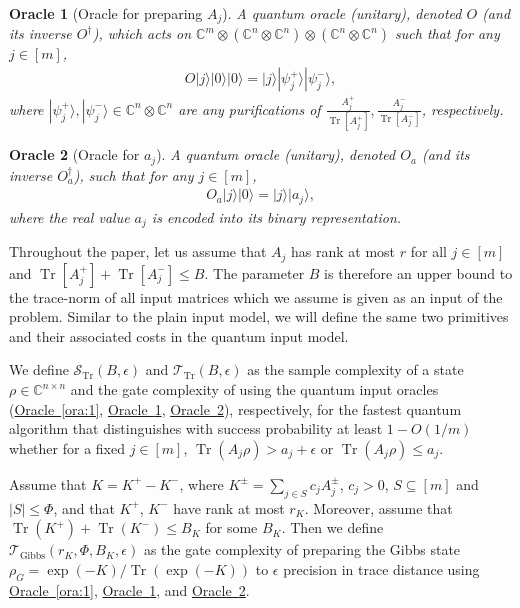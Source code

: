 \documentclass[a4paper,UKenglish,cleveref, autoref]{lipics-v2019}
\newtheorem{oracle}{Oracle}
\theoremstyle{remark}
\numberwithin{equation}{section}
\numberwithin{oracle}{section}
\numberwithin{remark}{section}
\newcommand{\ora}[1]{\hyperref[ora:#1]{Oracle~\ref*{ora:#1}}}
\def\>{\rangle}
\newcommand{\range}[1]{[#1]}
\newcommand{\C}{\ensuremath{\mathbb{C}}}
\DeclareMathOperator{\tr}{Tr}
\DeclareMathOperator{\Tr}{Tr}
\begin{document}
\begin{oracle}[Oracle for preparing $A_{j}$] \label{ora:2}
A quantum oracle (unitary), denoted $O$ (and its inverse $O^\dagger$), which acts on $\C^{m}\otimes(\C^{n}\otimes\C^{n}) \otimes (\C^{n}\otimes\C^{n})$ such that for any $j\in\range{m}$,
\begin{align}
O|j\>|0\>|0\>=|j\>|\psi_{j}^{+}\>|\psi_{j}^{-}\>,
\end{align}
where $|\psi_{j}^{+}\>, |\psi_{j}^{-}\> \in \C^{n}\otimes\C^{n}$ are any purifications of $\frac{A_{j}^{+}}{\Tr[A_{j}^{+}]}, \frac{A_{j}^{-}}{\Tr[A_{j}^{-}]}$, respectively.
\end{oracle}

\begin{oracle}[Oracle for $a_{j}$] \label{ora:3}
A quantum oracle (unitary), denoted $O_{a}$ (and its inverse $O_{a}^\dagger$), such that for any $j\in\range{m}$,
\begin{align}
O_{a}|j\>|0\>=|j\>|a_{j}\>,
\end{align}
where the real value $a_{j}$ is encoded into its binary representation.
\end{oracle}

Throughout the paper, let us assume that $A_{j}$ has rank at most $r$ for all $j\in\range{m}$ and $\Tr[A_{j}^{+}]+\Tr[A_{j}^{-}]\leq B$. The parameter $B$ is therefore an upper bound to the trace-norm of all input matrices which we assume is given as an input of the problem. Similar to the plain input model, we will define the same two primitives and their associated costs in the quantum input model.

\begin{definition}\label{defn:quantum-trace-main}
We define $\mathcal{S}_{\tr}(B,\epsilon)$ and $\mathcal{T}_{\tr}(B,\epsilon)$ as the sample complexity of a state $\rho\in\C^{n\times n}$ and the gate complexity of using the quantum input oracles (\ora{1}, \ora{2}, \ora{3}), respectively, for the fastest quantum algorithm that distinguishes with success probability at least $1-O(1/m)$ whether for a fixed $j\in\range{m}$, $\tr(A_{j} \rho)>a_{j}+\epsilon$ or $\tr(A_{j} \rho)\leq a_{j}$.
 \end{definition}

\begin{definition}\label{defn:quantum-Gibbs-main}
Assume that $K = K^+ - K^-$, where $K^{\pm}=\sum_{j \in S} c_j A_j^{\pm}$, $c_j>0$, $S\subseteq\range{m}$ and $|S|\leq\Phi$, and that $K^+$, $K^-$ have rank at most $r_{K}$. Moreover, assume that $\tr(K^+) + \tr(K^-) \leq B_{K}$ for some $B_{K}$. Then we define $\mathcal{T}_{\text{Gibbs}}(r_{K},\Phi,B_{K},\epsilon)$ as the gate complexity of preparing the Gibbs state $\rho_{G}=\exp(-K)/\tr(\exp(-K))$ to $\epsilon$ precision in trace distance using \ora{1}, \ora{2}, and \ora{3}.
\end{definition}
\end{document}
